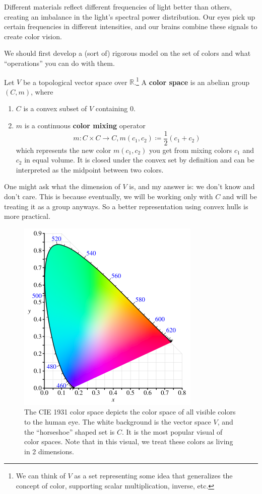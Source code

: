 Different materials reflect different frequencies of light better than others, creating an imbalance in the light's spectral power distribution. Our eyes pick up certain frequencies in different intensities, and our brains combine these signals to create color vision. 

We should first develop a (sort of) rigorous model on the set of colors and what ``operations'' you can do with them. 

\begin{definition} 
  Let $V$ be a topological vector space over $\mathbb{R}$.\footnote{We can think of $V$ as a set representing some idea that generalizes the concept of color, supporting scalar multiplication, inverse, etc.} A \textbf{color space} is an abelian group $(C, m)$, where 
  \begin{enumerate}
    \item $C$ is a convex subset of $V$ containing $0$. 
    \item $m$ is a continuous \textbf{color mixing} operator 
    \begin{equation}
      m: C \times C \to C, m(c_1, c_2) \coloneqq \frac{1}{2} (c_1 + c_2) 
    \end{equation}  
    which represents the new color $m(c_1, c_2)$ you get from mixing colors $c_1$ and $c_2$ in equal volume. It is closed under the convex set by definition and can be interpreted as the midpoint between two colors. 
  \end{enumerate}
\end{definition} 

One might ask what the dimension of $V$ is, and my answer is: we don't know and don't care. This is because eventually, we will be working only with $C$ and will be treating it as a group anyways. So a better representation using convex hulls is more practical. 

\begin{figure}[H]
  \centering 
  \includegraphics[scale=0.7]{img/horseshoe.png}
  \caption{The CIE 1931 color space depicts the color space of all visible colors to the human eye. The white background is the vector space $V$, and the ``horseshoe'' shaped set is $C$. It is the most popular visual of color spaces. Note that in this visual, we treat these colors as living in 2 dimensions.} 
  \label{fig:horseshoe}
\end{figure}

